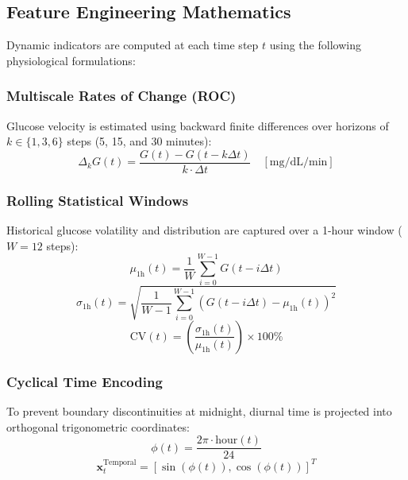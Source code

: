 \documentclass[10pt,journal,compsoc,twocolumn]{IEEEtran}
\begin{document}
\subsection{Feature Engineering Mathematics}
Dynamic indicators are computed at each time step $t$ using the following physiological formulations:

\subsubsection{Multiscale Rates of Change (ROC)}
Glucose velocity is estimated using backward finite differences over horizons of $k \in \{1, 3, 6\}$ steps (5, 15, and 30 minutes):
\begin{equation}
\Delta_k G(t) = \frac{G(t) - G(t - k\Delta t)}{k \cdot \Delta t} \quad \left[\text{mg/dL/min}\right]
\end{equation}

\subsubsection{Rolling Statistical Windows}
Historical glucose volatility and distribution are captured over a 1-hour window ($W = 12$ steps):
\begin{equation}
\mu_{1\text{h}}(t) = \frac{1}{W} \sum_{i=0}^{W-1} G(t - i\Delta t)
\end{equation}
\begin{equation}
\sigma_{1\text{h}}(t) = \sqrt{\frac{1}{W-1} \sum_{i=0}^{W-1} \left(G(t - i\Delta t) - \mu_{1\text{h}}(t)\right)^2}
\end{equation}
\begin{equation}
\text{CV}(t) = \left( \frac{\sigma_{1\text{h}}(t)}{\mu_{1\text{h}}(t)} \right) \times 100\%
\end{equation}

\subsubsection{Cyclical Time Encoding}
To prevent boundary discontinuities at midnight, diurnal time is projected into orthogonal trigonometric coordinates:
\begin{equation}
\phi(t) = \frac{2\pi \cdot \text{hour}(t)}{24}
\end{equation}
\begin{equation}
\mathbf{x}_t^{\text{Temporal}} = \left[ \sin(\phi(t)), \cos(\phi(t)) \right]^T
\end{equation}
\end{document}

